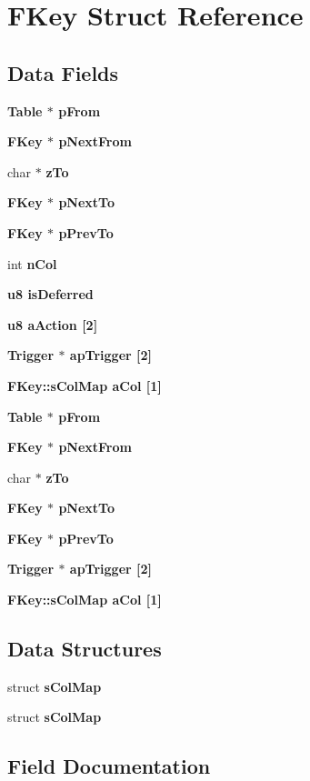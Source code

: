 \section{FKey Struct Reference}
\label{structFKey}
\subsection*{Data Fields}
\begin{CompactItemize}
\item 
\bf{Table} $\ast$ \bf{p\-From}
\item 
\bf{FKey} $\ast$ \bf{p\-Next\-From}
\item 
char $\ast$ \bf{z\-To}
\item 
\bf{FKey} $\ast$ \bf{p\-Next\-To}
\item 
\bf{FKey} $\ast$ \bf{p\-Prev\-To}
\item 
int \bf{n\-Col}
\item 
\bf{u8} \bf{is\-Deferred}
\item 
\bf{u8} \bf{a\-Action} [2]
\item 
\bf{Trigger} $\ast$ \bf{ap\-Trigger} [2]
\item 
\bf{FKey::s\-Col\-Map} \bf{a\-Col} [1]
\item 
\bf{Table} $\ast$ \bf{p\-From}
\item 
\bf{FKey} $\ast$ \bf{p\-Next\-From}
\item 
char $\ast$ \bf{z\-To}
\item 
\bf{FKey} $\ast$ \bf{p\-Next\-To}
\item 
\bf{FKey} $\ast$ \bf{p\-Prev\-To}
\item 
\bf{Trigger} $\ast$ \bf{ap\-Trigger} [2]
\item 
\bf{FKey::s\-Col\-Map} \bf{a\-Col} [1]
\end{CompactItemize}
\subsection*{Data Structures}
\begin{CompactItemize}
\item 
struct \bf{s\-Col\-Map}
\item 
struct \bf{s\-Col\-Map}
\end{CompactItemize}


\subsection{Field Documentation}
